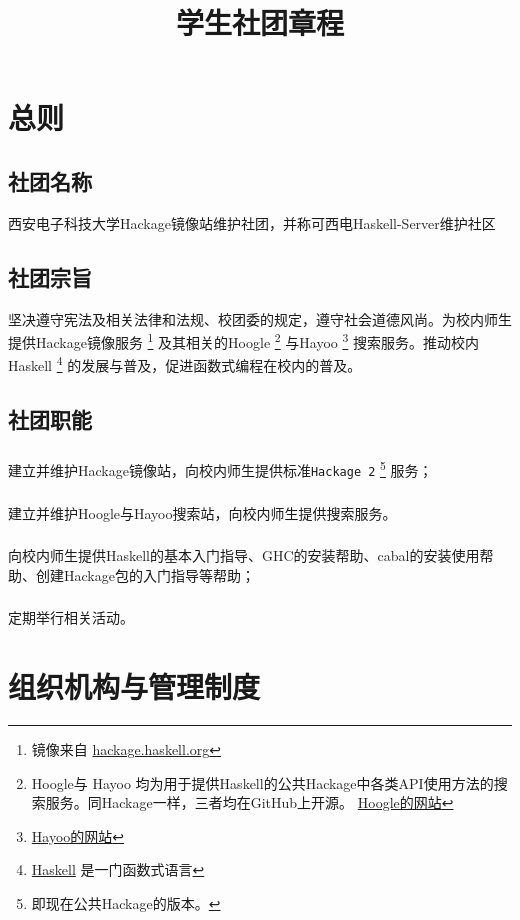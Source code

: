 \documentclass[UTF8]{ctexart}
\title{学生社团章程}
\begin{document}
\maketitle
\newpage
\section{总则}
\subsection{社团名称}
西安电子科技大学Hackage镜像站维护社团，并称可西电Haskell-Server维护社区
\subsection{社团宗旨}
坚决遵守宪法及相关法律和法规、校团委的规定，遵守社会道德风尚。为校内师生提供Hackage镜像服务 \footnote{镜像来自 
\href{http://hackage.haskell.org}{hackage.haskell.org}}
及其相关的Hoogle
\footnote{Hoogle与 Hayoo 均为用于提供Haskell的公共Hackage中各类API使用方法的搜索服务。同Hackage一样，三者均在GitHub上开源。
\href{http://hoogle.haskell.org}{Hoogle的网站}
}
与Hayoo
\footnote{\href{http://hayoo.fh-wedel.de/}{Hayoo的网站}}
搜索服务。推动校内Haskell
\footnote{\href{http://www.haskell.org}{Haskell} 是一门函数式语言}
的发展与普及，促进函数式编程在校内的普及。
\subsection{社团职能}
\subsubsection{}建立并维护Hackage镜像站，向校内师生提供标准\verb"Hackage 2"
\footnote{即现在公共Hackage的版本。}
服务；
\subsubsection{}建立并维护Hoogle与Hayoo搜索站，向校内师生提供搜索服务。
\subsubsection{}向校内师生提供Haskell的基本入门指导、GHC的安装帮助、cabal的安装使用帮助、创建Hackage包的入门指导等帮助；
\subsubsection{}定期举行相关活动。

\section{组织机构与管理制度}
\end{document}
